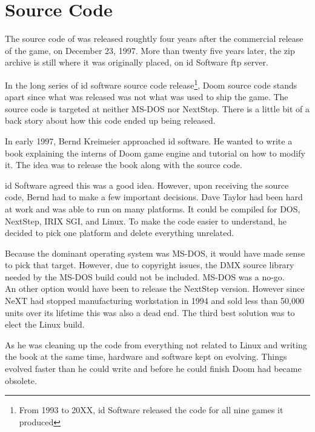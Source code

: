 \section{Source Code}
The source code of \doom was released roughtly four years after the commercial release of the game, on December 23, 1997. More than twenty five years later, the zip archive is still where it was originally placed, on id Software ftp server.\\
\par
{}
\par
 In the long series of id software source code release\footnote{From 1993 to 20XX, id Software released the code for all nine games it produced}, Doom source code stands apart since what was released was not what was used to ship the game. The source code is targeted at neither MS-DOS nor NextStep. There is a little bit of a back story about how this code ended up being released.\\
 \par
 In early 1997, Bernd Kreimeier approached id software. He wanted to write a book explaining the interns of Doom game engine and tutorial on how to modify it. The idea was to release the book along with the source code.\\
 \par
  id Software agreed this was a good idea. However, upon receiving the source code, Bernd had to make a few important decisions. Dave Taylor had been hard at work and \doom was able to run on many platforms.  It could be compiled for DOS, NextStep, IRIX SGI, and Linux. To make the code easier to understand, he decided to pick one platform and delete everything unrelated.\\
  \par
  Because the dominant operating system was MS-DOS, it would have made sense to pick that target. However, due to copyright issues, the DMX source library needed by the MS-DOS build could not be included. MS-DOS was a no-go.\\
   An other option would have been to release the NextStep version. However since NeXT had stopped manufacturing workstation in 1994 and sold less than 50,000 units over its lifetime this was also a dead end. The third best solution was to elect the Linux build.\\
\par
 As he was cleaning up the code from everything not related to Linux and writing the book at the same time, hardware and software kept on evolving. Things evolved faster than he could write and before he could finish Doom had became obsolete.\\
